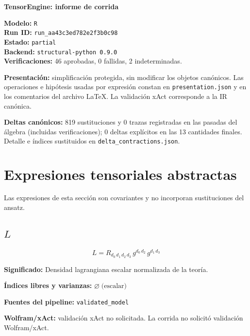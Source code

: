 \documentclass[11pt]{article}
\begin{document}
\begin{center}
{\Large\bfseries TensorEngine: informe de corrida}
\end{center}
\textbf{Modelo:} \texttt{R}\\
\textbf{Run ID:} \texttt{run\_aa43c3ed782e2f3b0c98}\\
\textbf{Estado:} \texttt{partial}\\
\textbf{Backend:} \texttt{structural-python 0.9.0}\\
\textbf{Verificaciones:} 46 aprobadas, 0 fallidas, 2 indeterminadas.
\par\smallskip
\textbf{Presentación:} simplificación protegida, sin modificar los objetos canónicos. Las operaciones e hipótesis usadas por expresión constan en \texttt{presentation.json} y en los comentarios del archivo LaTeX. La validación xAct corresponde a la IR canónica.\par
\textbf{Deltas canónicos:} 819 sustituciones y 0 trazas registradas en las pasadas del álgebra (incluidas verificaciones); 0 deltas explícitos en las 13 cantidades finales. Detalle e índices sustituidos en \texttt{delta\_contractions.json}.\par
\section*{Expresiones tensoriales abstractas}
Las expresiones de esta sección son covariantes y no incorporan sustituciones del ansatz.
\subsection*{$ L $}
\begin{dmath*}[breakdepth={5}]
L = R{}_{d_{0}\,d_{1}\,d_{2}\,d_{3}}\,g{}^{d_{0}\,d_{2}}\,g{}^{d_{1}\,d_{3}}
\end{dmath*}
\par\vspace{1.2\baselineskip}\noindent
\begin{minipage}{\linewidth}
\textbf{Significado:} Densidad lagrangiana escalar normalizada de la teoría.\par
\textbf{Índices libres y varianzas:} $ \varnothing\;\text{(escalar)} $\par
\textbf{Fuentes del pipeline:} \texttt{validated\_model}\par
\textbf{Wolfram/xAct:} validación xAct no solicitada. La corrida no solicitó validación Wolfram/xAct.\par
\end{minipage}
\end{document}

